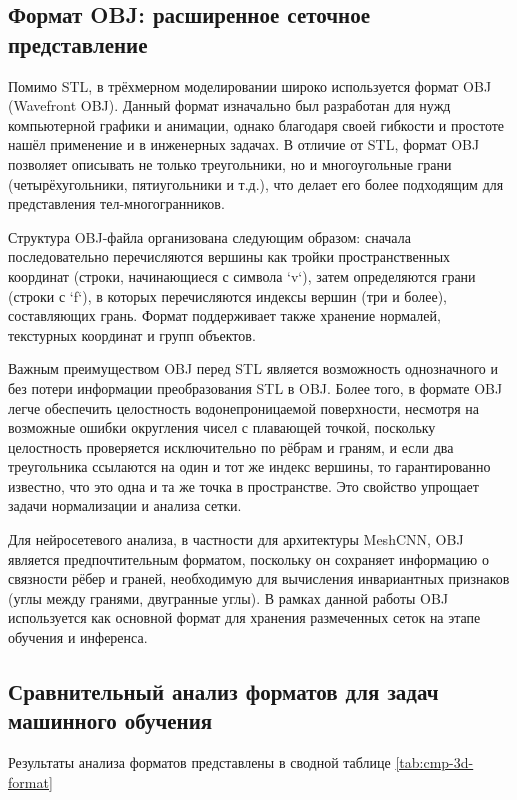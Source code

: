 \subsection{Формат OBJ: расширенное сеточное представление}

Помимо STL, в трёхмерном моделировании широко используется формат OBJ (Wavefront OBJ). Данный формат изначально был разработан для нужд компьютерной графики и анимации, однако благодаря своей гибкости и простоте нашёл применение и в инженерных задачах. В отличие от STL, формат OBJ позволяет описывать не только треугольники, но и многоугольные грани (четырёхугольники, пятиугольники и т.д.), что делает его более подходящим для представления тел-многогранников.

Структура OBJ-файла организована следующим образом: сначала последовательно перечисляются вершины как тройки пространственных координат (строки, начинающиеся с символа `v`), затем определяются грани (строки с `f`), в которых перечисляются индексы вершин (три и более), составляющих грань. Формат поддерживает также хранение нормалей, текстурных координат и групп объектов.

Важным преимуществом OBJ перед STL является возможность однозначного и без потери информации преобразования STL в OBJ. Более того, в формате OBJ легче обеспечить целостность водонепроницаемой поверхности, несмотря на возможные ошибки округления чисел с плавающей точкой, поскольку целостность проверяется исключительно по рёбрам и граням, и если два треугольника ссылаются на один и тот же индекс вершины, то гарантированно известно, что это одна и та же точка в пространстве. Это свойство упрощает задачи нормализации и анализа сетки.

Для нейросетевого анализа, в частности для архитектуры MeshCNN, OBJ является предпочтительным форматом, поскольку он сохраняет информацию о связности рёбер и граней, необходимую для вычисления инвариантных признаков (углы между гранями, двугранные углы). В рамках данной работы OBJ используется как основной формат для хранения размеченных сеток на этапе обучения и инференса.

\subsection{Сравнительный анализ форматов для задач машинного обучения}

Результаты анализа форматов представлены в сводной таблице \ref{tab:cmp-3d-format}

